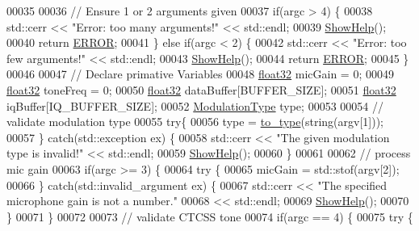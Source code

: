 \begin{DoxyCode}
00035 
00036     \textcolor{comment}{// Ensure 1 or 2 arguments given}
00037     \textcolor{keywordflow}{if}(argc > 4) \{
00038         std::cerr << \textcolor{stringliteral}{"Error: too many arguments!"} << std::endl;
00039         \hyperlink{namespaceradio_a6db7c682d0f9aeac8cb5042717b8ae7f}{ShowHelp}();
00040         \textcolor{keywordflow}{return} \hyperlink{definitions_8hpp_a8fe83ac76edc595f6b98cd4a4127aed5}{ERROR};
00041     \} \textcolor{keywordflow}{else} \textcolor{keywordflow}{if}(argc < 2) \{
00042         std::cerr << \textcolor{stringliteral}{"Error: too few arguments!"} << std::endl;
00043         \hyperlink{namespaceradio_a6db7c682d0f9aeac8cb5042717b8ae7f}{ShowHelp}();
00044         \textcolor{keywordflow}{return} \hyperlink{definitions_8hpp_a8fe83ac76edc595f6b98cd4a4127aed5}{ERROR};
00045     \}
00046 
00047     \textcolor{comment}{// Declare primative Variables}
00048     \hyperlink{definitions_8hpp_aacdc525d6f7bddb3ae95d5c311bd06a1}{float32} micGain = 0;
00049     \hyperlink{definitions_8hpp_aacdc525d6f7bddb3ae95d5c311bd06a1}{float32} toneFreq = 0;
00050     \hyperlink{definitions_8hpp_aacdc525d6f7bddb3ae95d5c311bd06a1}{float32} dataBuffer[BUFFER\_SIZE];
00051     \hyperlink{definitions_8hpp_aacdc525d6f7bddb3ae95d5c311bd06a1}{float32} iqBuffer[IQ\_BUFFER\_SIZE];
00052     \hyperlink{namespaceradio_a46fb7299001138f28b7f69975c58399e}{ModulationType} type;
00053 
00054     \textcolor{comment}{// validate modulation type}
00055     \textcolor{keywordflow}{try}\{
00056         type = \hyperlink{namespaceradio_a402fe28e2e2bb2be7a0d2d9f74cc640d}{to\_type}(\textcolor{keywordtype}{string}(argv[1]));
00057     \} \textcolor{keywordflow}{catch}(std::exception ex) \{
00058         std::cerr << \textcolor{stringliteral}{"The given modulation type is invalid!"} << std::endl;
00059         \hyperlink{namespaceradio_a6db7c682d0f9aeac8cb5042717b8ae7f}{ShowHelp}();
00060     \}
00061 
00062     \textcolor{comment}{// process mic gain}
00063     \textcolor{keywordflow}{if}(argc >= 3) \{
00064         \textcolor{keywordflow}{try} \{
00065             micGain = std::stof(argv[2]);
00066         \} \textcolor{keywordflow}{catch}(std::invalid\_argument ex) \{
00067             std::cerr << \textcolor{stringliteral}{"The specified microphone gain is not a number."}
00068                 << std::endl;
00069             \hyperlink{namespaceradio_a6db7c682d0f9aeac8cb5042717b8ae7f}{ShowHelp}();
00070         \}
00071     \}
00072 
00073     \textcolor{comment}{// validate CTCSS tone}
00074     \textcolor{keywordflow}{if}(argc == 4) \{
00075         \textcolor{keywordflow}{try} \{

\end{DoxyCode}
